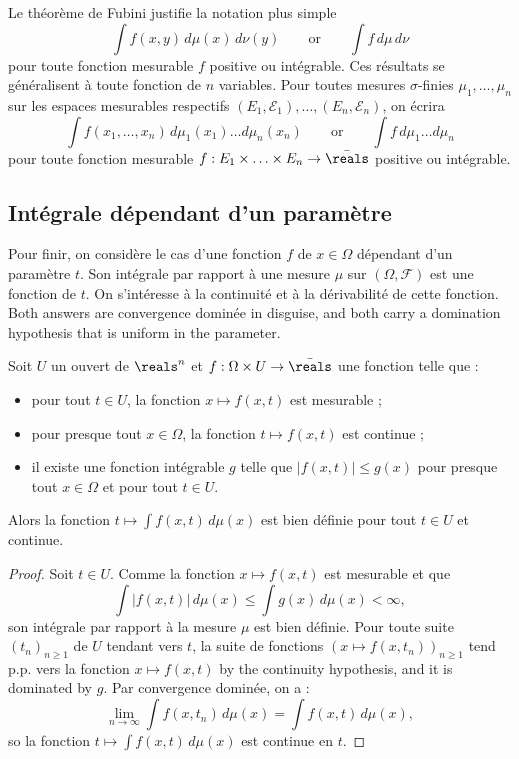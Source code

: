 Le théorème de Fubini justifie la notation plus simple
\[
  \int f(x,y) \, d\mu(x) \, d\nu(y)
  \qquad \text{or} \qquad
  \int f \, d\mu \, d\nu
\]
pour toute fonction mesurable $f$ positive ou intégrable. Ces résultats se
généralisent à toute fonction de $n$ variables. Pour toutes mesures $\sigma$-finies
$\mu_{1},\ldots,\mu_{n}$ sur les espaces mesurables respectifs
$(E_{1},\mathcal{E}_{1}),\ldots,(E_{n},\mathcal{E}_{n})$, on écrira
\[
  \int f(x_{1},\ldots,x_{n}) \, d\mu_{1}(x_{1}) \ldots d\mu_{n}(x_{n})
  \qquad \text{or} \qquad
  \int f \, d\mu_{1} \ldots d\mu_{n}
\]
pour toute fonction mesurable $f : E_{1} \times \ldots \times E_{n} \to
\bar{\reals}$ positive ou intégrable.

\subsection{Intégrale dépendant d'un paramètre}

Pour finir, on considère le cas d'une fonction $f$ de $x \in \Omega$ dépendant d'un
paramètre $t$. Son intégrale par rapport à une mesure $\mu$ sur $(\Omega,\mathcal{F})$
est une fonction de $t$. On s'intéresse à la continuité et à la dérivabilité de cette
fonction. Both answers are convergence dominée in disguise, and both carry a
domination hypothesis that is uniform in the parameter.

\begin{theorem}
  Soit $U$ un ouvert de $\reals^{n}$ et $f : \Omega \times U \to \bar{\reals}$ une
  fonction telle que :
  \begin{itemize}
    \item pour tout $t \in U$, la fonction $x \mapsto f(x,t)$ est mesurable ;
    \item pour presque tout $x \in \Omega$, la fonction $t \mapsto f(x,t)$ est
      continue ;
    \item il existe une fonction intégrable $g$ telle que $|f(x,t)| \leq g(x)$ pour
      presque tout $x \in \Omega$ et pour tout $t \in U$.
  \end{itemize}
  Alors la fonction $t \mapsto \int f(x,t) \, d\mu(x)$ est bien définie pour tout $t
  \in U$ et continue.
\end{theorem}

\begin{proof}
  Soit $t \in U$. Comme la fonction $x \mapsto f(x,t)$ est mesurable et que
  \[
    \int |f(x,t)| \, d\mu(x) \leq \int g(x) \, d\mu(x) < \infty ,
  \]
  son intégrale par rapport à la mesure $\mu$ est bien définie. Pour toute suite
  $(t_{n})_{n \geq 1}$ de $U$ tendant vers $t$, la suite de fonctions $(x \mapsto
  f(x,t_{n}))_{n \geq 1}$ tend p.p. vers la fonction $x \mapsto f(x,t)$ by the
  continuity hypothesis, and it is dominated by $g$. Par convergence dominée, on a :
  \[
    \lim_{n \to \infty} \int f(x,t_{n}) \, d\mu(x) = \int f(x,t) \, d\mu(x) ,
  \]
  so la fonction $t \mapsto \int f(x,t) \, d\mu(x)$ est continue en $t$.
\end{proof}

